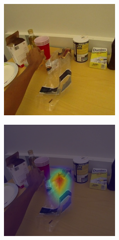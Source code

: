 \documentclass[10pt,twocolumn,hidelinks,letterpaper]{article}
\begin{document}
\begin{figure}[t]
  \centering
  \begin{subfigure}{.35\linewidth}
  	\includegraphics[width=\linewidth]{images/Cams1/S2_take_cheese/rgb0020.png}
  \end{subfigure}
  \begin{subfigure}{.35\linewidth}
  	\includegraphics[width=\linewidth]{images/Cams1/S2_take_cheese/rgb0020_CAM.png}

\end{subfigure}
\end{figure}
\end{document}
